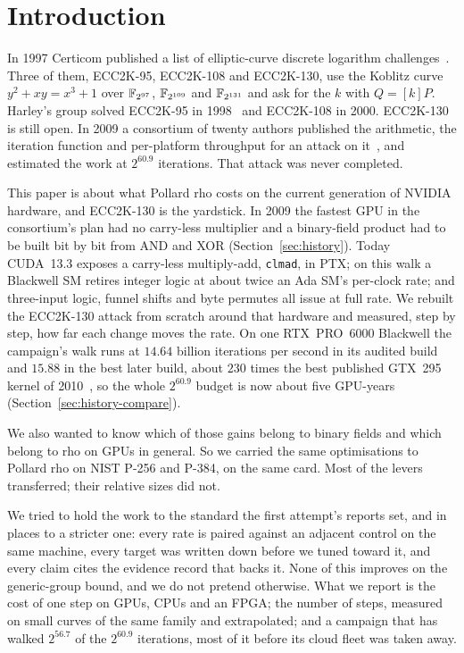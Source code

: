 \section{Introduction}
\label{sec:intro}

In 1997 Certicom published a list of elliptic-curve discrete
logarithm challenges~\cite{certicom1997}. Three of them, ECC2K-95,
ECC2K-108 and ECC2K-130, use the Koblitz curve $y^2+xy=x^3+1$ over
$\mathbb{F}_{2^{97}}$, $\mathbb{F}_{2^{109}}$ and $\mathbb{F}_{2^{131}}$ and ask for the $k$
with $Q=[k]P$. Harley's group solved ECC2K-95 in 1998~\cite{harley1998}
and ECC2K-108 in 2000. ECC2K-130 is still open. In 2009 a consortium of
twenty authors published the arithmetic, the iteration function and
per-platform throughput for an attack on
it~\cite{bailey2009,bailey2009sharcs,bos2010cell,fan2010fpga}, and
estimated the work at $2^{60.9}$ iterations. That attack was never
completed.

This paper is about what Pollard rho costs on the current generation
of NVIDIA hardware, and ECC2K-130 is the yardstick. In 2009 the
fastest GPU in the consortium's plan had no carry-less multiplier and
a binary-field product had to be built bit by bit from AND and XOR
(Section~\ref{sec:history}). Today CUDA~13.3 exposes a carry-less
multiply-add, \texttt{clmad}, in PTX; on this walk a Blackwell SM retires
integer logic at about twice an Ada SM's per-clock rate; and three-input logic, funnel
shifts and byte permutes all issue at full rate. We rebuilt the
ECC2K-130 attack from scratch around that hardware and measured, step
by step, how far each change moves the rate. On one RTX~PRO~6000
Blackwell the campaign's walk runs at $14.64$ billion iterations per
second in its audited build and $15.88$ in the best later build, about
$230$ times the best published GTX~295 kernel of
2010~\cite{bernstein2010gpu}, so the whole $2^{60.9}$ budget is now
about five GPU-years (Section~\ref{sec:history-compare}).

We also wanted to know which of those gains belong to binary fields
and which belong to rho on GPUs in general. So we carried the same
optimisations to Pollard rho on NIST P-256 and P-384, on the same card.
Most of the levers transferred; their relative sizes did not.

We tried to hold the work to the standard the first attempt's reports
set, and in places to a stricter one: every rate is paired against an
adjacent control on the same machine, every target was written down
before we tuned toward it, and every claim cites the evidence record
that backs it. None of this improves on the
generic-group bound, and we do not pretend otherwise. What we report is
the cost of one step on GPUs, CPUs and an FPGA; the number of steps,
measured on small curves of the same family and extrapolated; and a
campaign that has walked $2^{56.7}$ of the $2^{60.9}$ iterations, most of
it before its cloud fleet was taken away.

